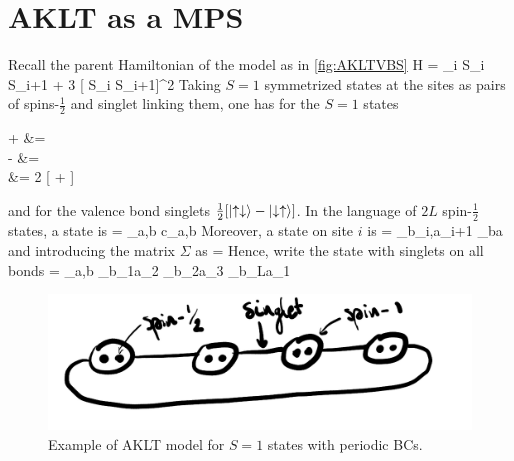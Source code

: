     \section{AKLT as a MPS}

    	Recall the parent Hamiltonian of the model as in \autoref{fig:AKLTVBS}
    	\be \mc H = \sum_i \vb* S_i \cdot \vb* S_{i+1} +  3 [ \vb* S_i \cdot \vb* S_{i+1}]^2 \ee
    	Taking $S=1$ symmetrized states at the sites as pairs of spins-$\frac 1 2$ and singlet linking them, one has for the $S=1$ states
    	\be \begin{split} \ket + &= \ket{\uparrow \uparrow} \\ \ket - &= \ket{\downarrow \downarrow} \\  &=  2 [\ket{\uparrow \downarrow} + \ket{\downarrow \uparrow}] \end{split} \label{eq:TNAKLTS1} \ee
    	and for the valence bond singlets $\frac 1 2 [\ket{\uparrow \downarrow} - \ket{\downarrow \uparrow}]$. In the language of $2L$ spin-$\frac 1 2$ states, a state is
    	\be \ket \psi = \sum_{\vb* a,\vb* b} c_{\vb* a,\vb* b}  \ee
    	Moreover, a state on site $i$ is
    	\be {} = \sum_{b_i,a_{i+1}} \Sigma_{ba}   \ee
    	and introducing the matrix $\Sigma$ as
    	\be \Sigma =  \ee
    	Hence, write the state with singlets on all bonds
    	\be \ket{\psi_\Sigma} = \sum_{\vb* a,\vb* b} \Sigma_{b_1a_2} \Sigma_{b_2a_3} \cdots \Sigma_{b_La_1}  \ee

    	\begin{figure}[h!]
            \centering
            \includegraphics[scale=0.2]{graphs/AKLTVBS.png}
            \caption{Example of AKLT model for $S=1$ states with periodic BCs.}
            \label{fig:AKLTVBS}
        \end{figure}


